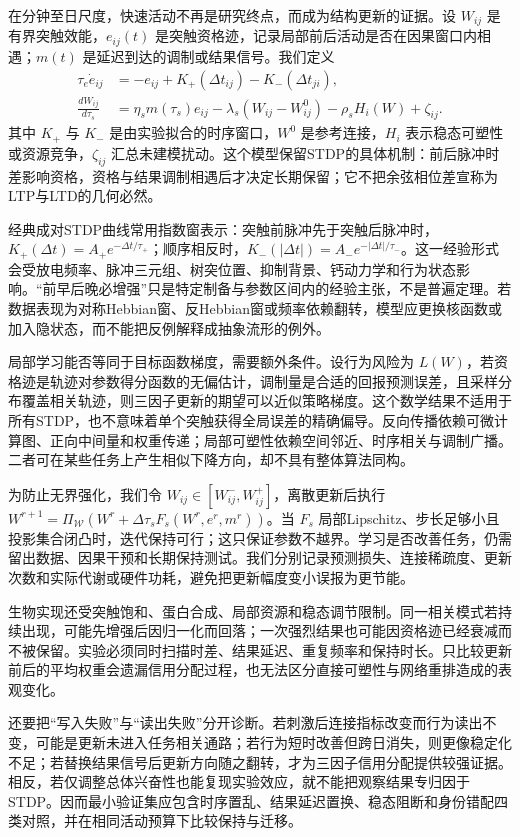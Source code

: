 在分钟至日尺度，快速活动不再是研究终点，而成为结构更新的证据。设 $W_{ij}$ 是有界突触效能，$e_{ij}(t)$ 是突触资格迹，记录局部前后活动是否在因果窗口内相遇；$m(t)$ 是延迟到达的调制或结果信号。我们定义
\begin{align}
 \tau_e\dot e_{ij}&=-e_{ij}+K_+(\Delta t_{ij})-K_-(\Delta t_{ji}),\\
 \frac{dW_{ij}}{d\tau_s}&=\eta_s m(\tau_s)e_{ij}-\lambda_s(W_{ij}-W_{ij}^{0})-\rho_sH_i(W)+\zeta_{ij}.
\end{align}
其中 $K_+$ 与 $K_-$ 是由实验拟合的时序窗口，$W^0$ 是参考连接，$H_i$ 表示稳态可塑性或资源竞争，$\zeta_{ij}$ 汇总未建模扰动。这个模型保留STDP的具体机制：前后脉冲时差影响资格，资格与结果调制相遇后才决定长期保留；它不把余弦相位差宣称为LTP与LTD的几何必然。

经典成对STDP曲线常用指数窗表示：突触前脉冲先于突触后脉冲时，$K_+(\Delta t)=A_+e^{-\Delta t/\tau_+}$；顺序相反时，$K_-(|\Delta t|)=A_-e^{-|\Delta t|/\tau_-}$。这一经验形式会受放电频率、脉冲三元组、树突位置、抑制背景、钙动力学和行为状态影响。“前早后晚必增强”只是特定制备与参数区间内的经验主张，不是普遍定理。若数据表现为对称Hebbian窗、反Hebbian窗或频率依赖翻转，模型应更换核函数或加入隐状态，而不能把反例解释成抽象流形的例外。

局部学习能否等同于目标函数梯度，需要额外条件。设行为风险为 $L(W)$，若资格迹是轨迹对参数得分函数的无偏估计，调制量是合适的回报预测误差，且采样分布覆盖相关轨迹，则三因子更新的期望可以近似策略梯度。这个数学结果不适用于所有STDP，也不意味着单个突触获得全局误差的精确偏导。反向传播依赖可微计算图、正向中间量和权重传递；局部可塑性依赖空间邻近、时序相关与调制广播。二者可在某些任务上产生相似下降方向，却不具有整体算法同构。

为防止无界强化，我们令 $W_{ij}\in[W^-_{ij},W^+_{ij}]$，离散更新后执行 $W^{r+1}=\Pi_{\mathcal W}(W^r+\Delta\tau_sF_s(W^r,e^r,m^r))$。当 $F_s$ 局部Lipschitz、步长足够小且投影集合闭凸时，迭代保持可行；这只保证参数不越界。学习是否改善任务，仍需留出数据、因果干预和长期保持测试。我们分别记录预测损失、连接稀疏度、更新次数和实际代谢或硬件功耗，避免把更新幅度变小误报为更节能。

生物实现还受突触饱和、蛋白合成、局部资源和稳态调节限制。同一相关模式若持续出现，可能先增强后因归一化而回落；一次强烈结果也可能因资格迹已经衰减而不被保留。实验必须同时扫描时差、结果延迟、重复频率和保持时长。只比较更新前后的平均权重会遗漏信用分配过程，也无法区分直接可塑性与网络重排造成的表观变化。

还要把“写入失败”与“读出失败”分开诊断。若刺激后连接指标改变而行为读出不变，可能是更新未进入任务相关通路；若行为短时改善但跨日消失，则更像稳定化不足；若替换结果信号后更新方向随之翻转，才为三因子信用分配提供较强证据。相反，若仅调整总体兴奋性也能复现实验效应，就不能把观察结果专归因于STDP。因而最小验证集应包含时序置乱、结果延迟置换、稳态阻断和身份错配四类对照，并在相同活动预算下比较保持与迁移。


